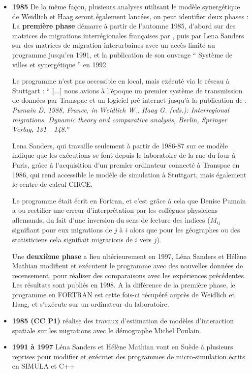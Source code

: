 \begin{itemize}[label=\textbullet]
\item \textbf{1985} De la même façon, plusieurs analyses utilisant le modèle synergétique de Weidlich et Haag seront également lancées, on peut identifier deux phases : La \textbf{première phase} démarre à partir de l’automne 1985, d’abord sur des matrices de migrations interrégionales françaises par \textcite{Pumain1987}, puis par Lena Sanders sur des matrices de migration interurbaines avec un accès limité au programme jusqu’en 1991, et la publication de son ouvrage \enquote{ Système de villes et synergétique } en 1992.

Le programme n'est pas accessible en local, mais exécuté via le réseau à Stuttgart : \enquote{ [...] nous avions à l’époque un premier système de transmission de données par Transpac et un logiciel pré-internet jusqu’à la publication de \autocite{Pumain1988} : \textit{Pumain D. 1988, France, in Weidlich W., Haag G. (eds.): Interregional migrations. Dynamic theory and comparative analysis, Berlin, Springer Verlag, 131 - 148.}}

Lena Sanders, qui travaille seulement à partir de 1986-87 sur ce modèle indique que les exécutions se font depuis le laboratoire de la rue du four à Paris, grâce à l'acquisition d'un premier ordinateur connecté à Transpac en 1986, qui rend accessible le modèle de simulation à Stuttgart, mais également le centre de calcul CIRCE.

Le programme était écrit en Fortran, et c’est grâce à cela que Denise Pumain a pu rectifier une erreur d’interprétation par les collègues physiciens allemands, du fait d’une inversion du sens de lecture des indices ($M_{ij}$ signifiant pour eux migrations de $j$ à $i$ alors que pour les géographes ou des statisticiens cela signifiait migrations de $i$ vers $j$).

Une \textbf{deuxième phase} a lieu ultérieurement en 1997, Léna Sanders et Hélène Mathian modifient et exécutent le programme avec des nouvelles données de recensement, pour réaliser des comparaisons avec les expériences précédentes. Les résultats sont publiés en 1998. A la différence de la première phase, le programme en FORTRAN est cette fois-ci récupéré auprès de Weidlich et Haag, et s'exécute sur un ordinateur du laboratoire.


\item \textbf{1985 (CC P1)} \textcite{Pumain1985} réalise des travaux d’estimation de modèles d’interaction spatiale sur les migrations avec le démographe Michel Poulain.

\item \textbf{1991 à 1997} Léna Sanders et Hélène Mathian vont en Suède à plusieurs reprises pour modifier et exécuter des programmes de micro-simulation écrits en SIMULA et C++

\end{itemize}

